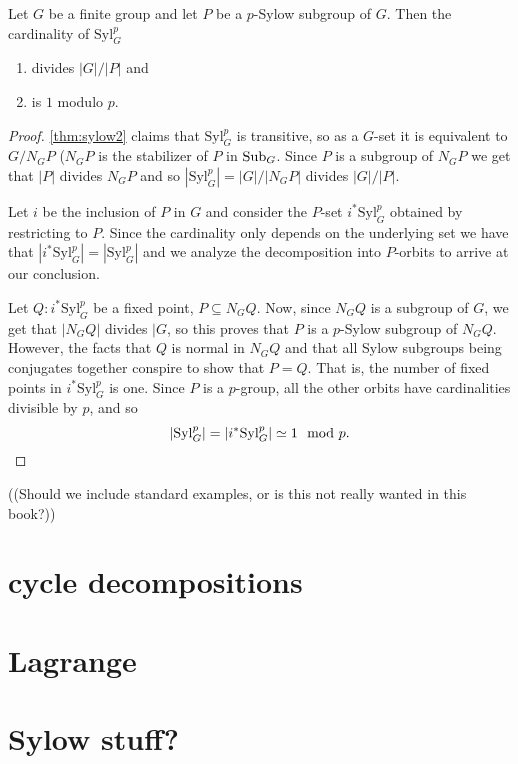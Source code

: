 \begin{theorem}
  \label{thm:sylow3}
  Let $G$ be a finite group and let $P$ be a $p$-Sylow subgroup of $G$.  Then the cardinality of $\mathrm{Syl}_G^p$
  \begin{enumerate}
  \item divides $|G|/|P|$ and 
  \item is $1$ modulo $p$.
  \end{enumerate}
\end{theorem}
\begin{proof}
  \cref{thm:sylow2} claims that $\mathrm{Syl}_G^p$ is transitive, so as a $G$-set it is equivalent to $G/N_GP$ ($N_GP$ is the stabilizer of $P$ in $\mathrm{Sub}_G$.  Since $P$ is a subgroup of $N_GP$ we get that $|P|$ divides $N_GP$ and so $|\mathrm{Syl}_G^p|=|G|/|N_GP|$ divides $|G|/|P|$.

  Let $i$ be the inclusion of $P$ in $G$ and consider the $P$-set $i^*\mathrm{Syl}_G^p$ obtained by restricting to $P$.  Since the cardinality only depends on the underlying set we have that $|i^*\mathrm{Syl}_G^p|=|\mathrm{Syl}_G^p|$ and we analyze the decomposition into $P$-orbits to arrive at our conclusion.

  Let $Q:i^*\mathrm{Syl}_G^p$ be a fixed point, \ie $P\subseteq N_GQ$.  Now, since $N_GQ$ is a subgroup of $G$, we get that $|N_GQ|$ divides $|G$, so this proves that $P$ is a $p$-Sylow subgroup of $N_GQ$.  However, the facts that $Q$ is normal in $N_GQ$ and that all Sylow subgroups being conjugates together conspire to show that $P=Q$.  That is, the number of fixed points in $i^*\mathrm{Syl}_G^p$ is one.  Since $P$ is a $p$-group, all the other orbits have cardinalities divisible by $p$, and so
  $$|\mathrm{Syl}_G^p|=|i^*\mathrm{Syl}_G^p|\oldequiv 1\mod p.$$
\end{proof}

((Should we include standard examples, or is this not really wanted in this book?))

\section{cycle decompositions}
\section{Lagrange}
\section{Sylow stuff?}

